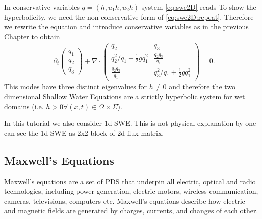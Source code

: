 \documentclass[a4paper,12pt]{article}
\theoremstyle{definition}
\theoremstyle{definition}
\begin{document}
In conservative variables $q = (h, u_1h,u_2h)$ system \eqref{eq:swe2D} reads
To show the hyperbolicity, we need the non-conservative form of \eqref{eq:swe2D:repeat}.
Therefore we rewrite the equation and introduce conservative variables as in the previous Chapter to obtain
\begin{align} 
&\partial_t\begin{pmatrix}
q_1\\
q_2\\
q_3
\end{pmatrix} + 
\nabla \cdot \left( \begin{matrix}
q_2 & q_3\\
q_2^2/q_1 + \frac{1}{2}gq_1^2 & \frac{q_2q_3}{q_1}\\
\frac{q_2q_3}{q_1} & q_3^2/q_1 + \frac{1}{2}gq_1^2
\end{matrix} \right) = 0.
\end{align}
This modes have three distinct eigenvalues for $h\neq 0$ and therefore the two dimensional Shallow Water Equations are a strictly hyperbolic system for wet domains (i.e. $h>0 \forall (x,t) \in \Omega\times\Sigma$).

In this tutorial we also consider 1d SWE. This is not physical explanation by one can see the 1d SWE as 2x2 block of 2d flux matrix.

\subsection{Maxwell's Equations}


Maxwell's equations are a set of PDS that underpin all electric, optical and radio technologies, including power generation, electric motors, wireless communication, cameras, televisions, computers etc. Maxwell's equations describe how electric and magnetic fields are generated by charges, currents, and changes of each other. 
\end{document}
